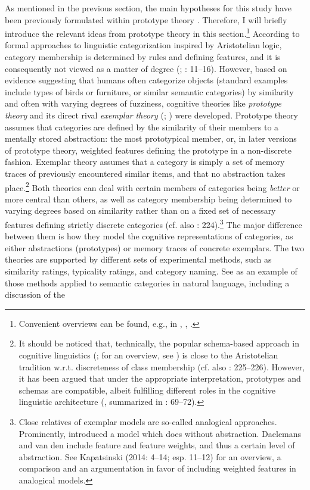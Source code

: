 \begin{styleMoutonText}
As mentioned in the previous section, the main hypotheses for this study have been previously formulated within prototype theory \citep{Köpcke1995}. Therefore, I will briefly introduce the relevant ideas from prototype theory in this section.\footnote{Convenient overviews can be found, e.g., in \citet{Taylor2003a}, \citet{Taylor2008}, \citet{Taylor2015}.} According to formal approaches to linguistic categorization inspired by Aristotelian logic, category membership is determined by rules and defining features, and it is consequently not viewed as a matter of degree (\citealt{Sutcliffe1993}; \citealt{Murphy2002}: 11–16). However, based on evidence suggesting that humans often categorize objects (standard examples include types of birds or furniture, or similar semantic categories) by similarity and often with varying degrees of fuzziness, cognitive theories like \textit{prototype} \textit{theory} \citep{Rosch1973} and its direct rival \textit{exemplar} \textit{theory} (\citealt{MedinSchaffer1978}; \citealt{Hintzman1986}) were developed. Prototype theory assumes that categories are defined by the similarity of their members to a mentally stored abstraction: the most prototypical member, or, in later versions of prototype theory, weighted features defining the prototype in a non-discrete fashion. Exemplar theory assumes that a category is simply a set of memory traces of previously encountered similar items, and that no abstraction takes place.\footnote{It should be noticed that, technically, the popular schema-based approach in cognitive linguistics (\citealt{Langacker1987}; for an overview, see \citealt{Tuggy2007}) is close to the Aristotelian tradition w.r.t. discreteness of class membership (cf. also \citealt{DivjakArppe2013}: 225–226). However, it has been argued that under the appropriate interpretation, prototypes and schemas are compatible, albeit fulfilling different roles in the cognitive linguistic architecture (\citealt{Langacker1987}, summarized in \citealt{Taylor2003a}: 69–72).} Both theories can deal with certain members of categories being \textit{better} or more central than others, as well as category membership being determined to varying degrees based on similarity rather than on a fixed set of necessary features defining strictly discrete categories (cf. also \citealt{DivjakArppe2013}: 224).\footnote{Close relatives of exemplar models are so-called analogical approaches. Prominently, \citet{Skousen1989} introduced a model which does without abstraction. Daelemans and van den \citet{Bosch2005} include feature and feature weights, and thus a certain level of abstraction. See Kapatsinski (2014: 4–14; esp. 11–12) for an overview, a comparison and an argumentation in favor of including weighted features in analogical models.} The major difference between them is how they model the cognitive representations of categories, as either abstractions (prototypes) or memory traces of concrete exemplars. The two theories are supported by different sets of experimental methods, such as similarity ratings, typicality ratings, and category naming. See \citet{StormsEtAl2000} as an example of those methods applied to semantic categories in natural language, including a discussion of the 
\end{styleMoutonText}

